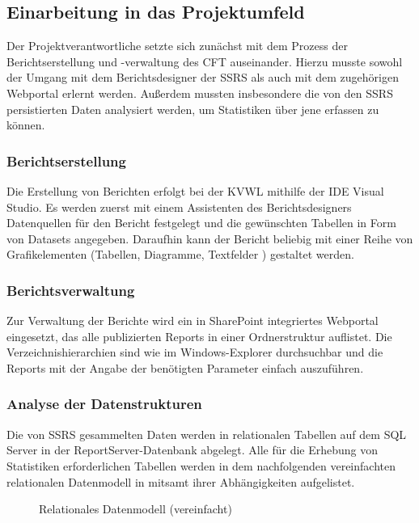 \subsection{Einarbeitung in das Projektumfeld}\label{sec:Einarbeitung}
Der Projektverantwortliche \autorName\xspace setzte sich zunächst mit dem Prozess der Berichts\-erstellung und -verwaltung des \ac{CFT} \teamName auseinander. Hierzu musste sowohl der Umgang mit dem Berichtsdesigner der \ac{SSRS} als auch mit dem zugehörigen Webportal erlernt werden. Außerdem mussten insbesondere die von den \ac{SSRS} persistierten Daten analysiert werden, um Statistiken über jene erfassen zu können.

\subsubsection{Berichtserstellung}\label{sec:Berichtserstellung}
Die Erstellung von Berichten erfolgt bei der \ac{KVWL} mithilfe der \ac{IDE} Visual Studio. Es werden zuerst mit einem Assistenten des Berichtsdesigners Datenquellen für den Bericht festgelegt und die gewünschten Tabellen in Form von Datasets angegeben. Daraufhin kann der Bericht beliebig mit einer Reihe von Grafikelementen (Tabellen, Diagramme, Textfelder \etc) gestaltet werden.

\subsubsection{Berichtsverwaltung}\label{sec:Berichtsverwaltung}
Zur Verwaltung der Berichte wird ein in SharePoint integriertes Webportal eingesetzt, das alle publizierten Reports in einer Ordnerstruktur auflistet. Die Verzeichnishierarchien sind wie im Windows-Explorer durchsuchbar und die Reports mit der Angabe der benötigten Parameter einfach auszuführen.

\subsubsection{Analyse der Datenstrukturen}\label{sec:Datenstrukturen}
Die von \ac{SSRS} gesammelten Daten werden in relationalen Tabellen auf dem SQL Server in der ReportServer-Datenbank abgelegt. Alle für die Erhebung von Statistiken erforderlichen Tabellen werden in dem nachfolgenden vereinfachten relationalen Datenmodell in  mitsamt ihrer Abhängigkeiten aufgelistet.
\begin{figure}[htb]
	\centering
	\caption{Relationales Datenmodell (vereinfacht)}
	\label{fig:Datenmodell}
\end{figure}

